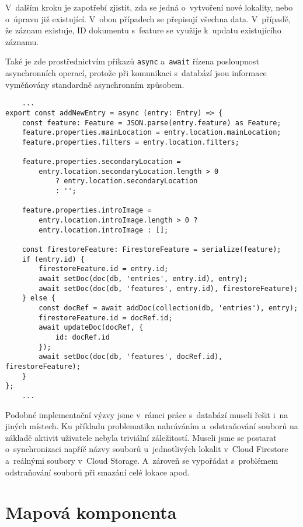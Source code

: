 V~dalším kroku je zapotřebí zjistit, zda se jedná o~vytvoření nové lokality, nebo o~úpravu již existující. V~obou případech se přepisují všechna data. V~případě, že záznam existuje, ID dokumentu s~feature se využije k~updatu existujícího záznamu.

Také je zde prostřednictvím příkazů \verb|async| a~\verb|await| řízena posloupnost asynchronních operací, protože při komunikaci s~databází jsou informace vyměňovány standardně asynchronním způsobem.

\begin{verbatim}
    ...
export const addNewEntry = async (entry: Entry) => {
    const feature: Feature = JSON.parse(entry.feature) as Feature;
    feature.properties.mainLocation = entry.location.mainLocation;
    feature.properties.filters = entry.location.filters;

    feature.properties.secondaryLocation =
        entry.location.secondaryLocation.length > 0
            ? entry.location.secondaryLocation
            : '';

    feature.properties.introImage =
        entry.location.introImage.length > 0 ? 
        entry.location.introImage : [];

    const firestoreFeature: FirestoreFeature = serialize(feature);
    if (entry.id) {
        firestoreFeature.id = entry.id;
        await setDoc(doc(db, 'entries', entry.id), entry);
        await setDoc(doc(db, 'features', entry.id), firestoreFeature);
    } else {
        const docRef = await addDoc(collection(db, 'entries'), entry);
        firestoreFeature.id = docRef.id;
        await updateDoc(docRef, {
            id: docRef.id
        });
        await setDoc(doc(db, 'features', docRef.id), firestoreFeature);
    }
};
    ...
    \end{verbatim}

Podobné implementační výzvy jsme v~rámci práce s~databází museli řešit i~na jiných místech. Ku příkladu problematika nahráváním a~odstraňování souborů na základě aktivit uživatele nebyla triviální záležitostí. Museli jsme se postarat o~synchronizaci napříč názvy souborů u~jednotlivých lokalit v~Cloud Firestore a~reálnými soubory v~Cloud Storage. A~zároveň se vypořádat s~problémem odstraňování souborů při smazání celé lokace apod.

\hypertarget{mapovuxe1-komponenta}{%
\section{Mapová komponenta}\label{mapovuxe1-komponenta}}

